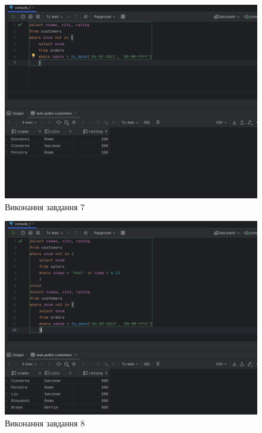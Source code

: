 \documentclass[14pt]{extreport}
\begin{document}
\begin{normalsize}
	\begin{figure}[H]
		\centering
		\includegraphics[scale=0.45]{7}
		\caption{Виконання завдання 7}
	\end{figure}
	
	\begin{figure}[H]
		\centering
		\includegraphics[scale=0.45]{8}
		\caption{Виконання завдання 8}
	\end{figure}
	

\end{normalsize}
\end{document}
